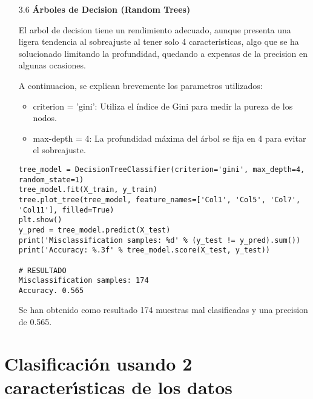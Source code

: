 \documentclass{article}
\begin{document}
\begin{itemize}

\item[3.6]  {\bf \'Arboles de Decision (Random Trees)}

El arbol de decision tiene un rendimiento adecuado, aunque presenta una ligera tendencia al sobreajuste al tener solo 4 caracteristicas, algo que se ha solucionado limitando la profundidad, quedando a expensas de la precision en algunas ocasiones.

A continuacion, se explican brevemente los parametros utilizados:

\begin{itemize}

\item
criterion = 'gini': Utiliza el índice de Gini para medir la pureza de los nodos.

\item
max-depth = 4: La profundidad máxima del árbol se fija en 4 para evitar el sobreajuste.

\end{itemize}

\begin{tcolorbox}[width=14cm]
\begin{scriptsize}
\begin{verbatim}
tree_model = DecisionTreeClassifier(criterion='gini', max_depth=4, random_state=1)
tree_model.fit(X_train, y_train)
tree.plot_tree(tree_model, feature_names=['Col1', 'Col5', 'Col7', 'Col11'], filled=True)
plt.show()
y_pred = tree_model.predict(X_test)
print('Misclassification samples: %d' % (y_test != y_pred).sum())
print('Accuracy: %.3f' % tree_model.score(X_test, y_test))

# RESULTADO
Misclassification samples: 174
Accuracy. 0.565
\end{verbatim}
\end{scriptsize}
\end{tcolorbox}

Se han obtenido como resultado 174 muestras mal clasificadas y una precision de 0.565.

\end{itemize}


\newpage

\section[4]{Clasificaci\'on usando 2 caracter\'{\i}sticas de los datos}
\end{document}
